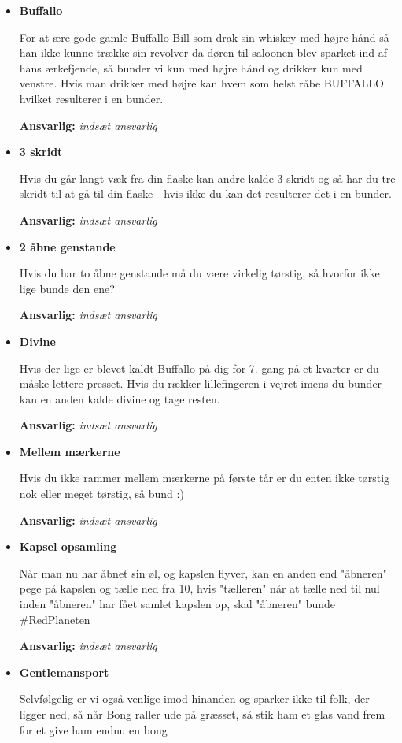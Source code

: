 \begin{itemize}
    \item \textbf{Buffallo} 
    
    For at ære gode gamle Buffallo Bill som drak sin whiskey med højre hånd så han ikke kunne trække sin revolver da døren til saloonen blev sparket ind af hans ærkefjende, så bunder vi kun med højre hånd og drikker kun med venstre. Hvis man drikker med højre kan hvem som helst råbe BUFFALLO hvilket resulterer i en bunder.
    
    \textbf{Ansvarlig:} \textit{indsæt ansvarlig}
    
    \item \textbf{3 skridt}
    
    Hvis du går langt væk fra din flaske kan andre kalde 3 skridt og så har du tre skridt til at gå til din flaske - hvis ikke du kan det resulterer det i en bunder.
    
    \textbf{Ansvarlig:} \textit{indsæt ansvarlig}
    
    \item \textbf{2 åbne genstande} 

    Hvis du har to åbne genstande må du være virkelig tørstig, så hvorfor ikke lige bunde den ene?
    
    \textbf{Ansvarlig:} \textit{indsæt ansvarlig}

    \item \textbf{Divine} 

    Hvis der lige er blevet kaldt Buffallo på dig for 7. gang på et kvarter er du måske lettere presset. Hvis du rækker lillefingeren i vejret imens du bunder kan en anden kalde divine og tage resten.
    
    \textbf{Ansvarlig:} \textit{indsæt ansvarlig}

    \item \textbf{Mellem mærkerne} 
    
    Hvis du ikke rammer mellem mærkerne på første tår er du enten ikke tørstig nok eller meget tørstig, så bund :)
    
    \textbf{Ansvarlig:} \textit{indsæt ansvarlig}

    \item \textbf{Kapsel opsamling} 
    
    Når man nu har åbnet sin øl, og kapslen flyver, kan en anden end "åbneren" pege på kapslen og tælle ned fra 10, hvis "tælleren" når at tælle ned til nul inden "åbneren" har fået samlet kapslen op, skal "åbneren" bunde \#RedPlaneten
    
    \textbf{Ansvarlig:} \textit{indsæt ansvarlig}
    
    \item \textbf{Gentlemansport}
    
    Selvfølgelig er vi også venlige imod hinanden og sparker ikke til folk, der ligger ned, så når Bong raller ude på græsset, så stik ham et glas vand frem for et give ham endnu en bong
\end{itemize}